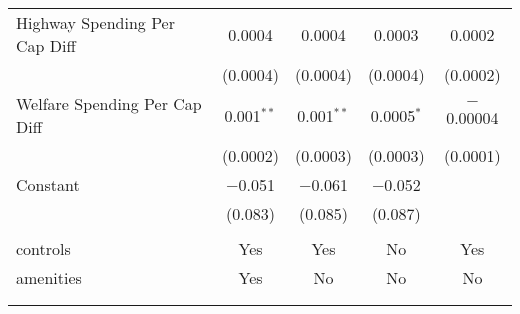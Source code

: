 \begin{table}[!htbp]
\begin{tabular}{@{\extracolsep{5pt}}lcccc}
  Highway Spending Per Cap Diff & 0.0004 & 0.0004 & 0.0003 & 0.0002 \\ 
  & (0.0004) & (0.0004) & (0.0004) & (0.0002) \\ 
  Welfare Spending Per Cap Diff & 0.001$^{**}$ & 0.001$^{**}$ & 0.0005$^{*}$ & $-$0.00004 \\ 
  & (0.0002) & (0.0003) & (0.0003) & (0.0001) \\ 
  Constant & $-$0.051 & $-$0.061 & $-$0.052 &  \\ 
  & (0.083) & (0.085) & (0.087) &  \\ 
 \hline \\[-1.8ex] 
controls & Yes & Yes & No & Yes \\ 
amenities & Yes & No & No & No \\ 
\hline \\[-1.8ex] 
\hline 
\hline \\[-1.8ex] 
\end{tabular} 
\end{table} 
